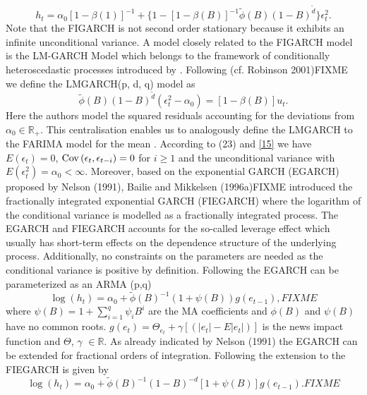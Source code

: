 \documentclass[12pt]{article}
\newcommand{\Cov}{\mbox{Cov\,}}
\begin{document}
\begin{equation}
	h_t=\alpha_0[1-\beta(1)]^{-1}+\{1-[1-\beta(B)]^{-1}\tilde{\phi}(B)(1-B)^{\tilde{d}}\}\epsilon^2_t.
\end{equation}
Note that the FIGARCH is not second order stationary because it exhibits an infinite unconditional variance. 
A model closely related to the FIGARCH model is the LM-GARCH Model which belongs to the framework of conditionally heteroscedastic processes introduced by \citet{robinson1991testing}. Following \citet{karanasos2004autocorrelation} (cf. Robinson 2001)FIXME  we define the LMGARCH(p, d, q) model as 
\begin{equation}
\label{15}
\tilde{\phi}(B)(1-B)^{\tilde{d}}(\epsilon_t^2-\alpha_0)=[1-\beta(B)]u_t.
\end{equation}
Here the authors model the squared residuals accounting for the deviations from $\alpha_0 \in \mathbb{R}_+$. This centralisation enables us to analogously define the LMGARCH to the FARIMA model for the mean \citep{conrad2006garch}. According to (23) and \eqref{15} we have $E(\epsilon_t)=0$, $\Cov(\epsilon_t,\epsilon_{t-i})=0$ for $i\geq1$ and the unconditional variance with $E(\epsilon^2_t)=\alpha_0<\infty$. Moreover, based on the exponential GARCH (EGARCH) proposed by Nelson (1991), Bailie and Mikkelsen (1996a)FIXME introduced the fractionally integrated exponential GARCH (FIEGARCH) where the logarithm of the conditional variance is modelled as a fractionally integrated process. The EGARCH and FIEGARCH accounts for the so-called leverage effect which usually has short-term effects on the dependence structure of the underlying process. Additionally, no constraints on the parameters are needed as the conditional variance is positive by definition. Following \citet{nelson1991conditional} the EGARCH can be parameterized as an ARMA (p,q)
\begin{equation}
	\log(h_t)=\alpha_0+\tilde{\phi}(B)^{-1}(1+\psi(B))g(e_{t-1}),FIXME
\end{equation}
where $\psi(B)=1+\sum_{i=1}^{q}\psi_iB^i$ are the MA coefficients and $\phi(B)$ and $\psi(B)$ have no common roots. $g(e_{t})=\Theta_{e_t}+\gamma[(|e_t|-E|e_t|)]$ is the news impact function and $\Theta$, $\gamma$ $\in \mathbb{R}$. As already indicated by Nelson (1991) the EGARCH can be extended for fractional orders of integration. Following \citet{bollerslev1996modeling} the extension to the FIEGARCH is given by  
\begin{equation}
\log(h_t)=\alpha_0+\tilde{\phi}(B)^{-1}(1-B)^{-d}[1+\psi(B)]g(e_{t-1}).FIXME
\end{equation}
\end{document}
